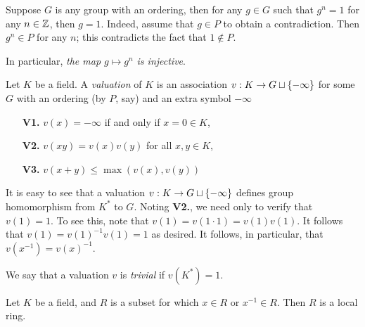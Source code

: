 \begin{rmk}
Suppose $G$ is any group with an ordering, then for any $g \in G$
such that $g^n = 1$ for any $n \in \mathbb{Z}$, then $g = 1$. Indeed, 
assume \wlog that $g \in P$ to obtain a contradiction. Then $g^n 
\in P$ for any $n$; this contradicts the fact that $1 \notin P$.

In particular, \emph{the map $g \mapsto g^n$ is injective}.
\end{rmk}

\begin{defn}
Let $K$ be a field. A \emph{valuation} of $K$ is an association 
$v: K \to G \sqcup \{-\infty\}$ for some $G$ with an ordering (by 
$P$, say) and an extra symbol $-\infty$
\begin{enumerate}
\item[\textbf{V1.}] $v(x) = -\infty$ if and only if $x = 0 \in K$,

\item[\textbf{V2.}] $v(xy) = v(x)v(y)$ for all $x, y \in K$,

\item[\textbf{V3.}] $v(x + y) \leq \max(v(x), v(y))$
\end{enumerate}
\end{defn}

\begin{rmk}
It is easy to see that a valuation $v: K \to G\sqcup \{-\infty\}$
defines group homomorphism from $K^*$ to $G$. Noting \textbf{V2.},
we need only to verify that $v(1) = 1$. To see this, note that 
$v(1) = v(1 \cdot 1) = v(1)v(1)$. It follows that $v(1) = 
v(1)^{-1}v(1) = 1$ as desired. It follows, in particular, that
$v(x^{-1}) = v(x)^{-1}$.
\end{rmk}

We say that a valuation $v$ is \emph{trivial} if $v(K^*) = 1$.

\begin{prop}
Let $K$ be a field, and $R$ is a subset for which $x \in R$ or
$x^{-1} \in R$. Then $R$ is a local ring.
\end{prop}

